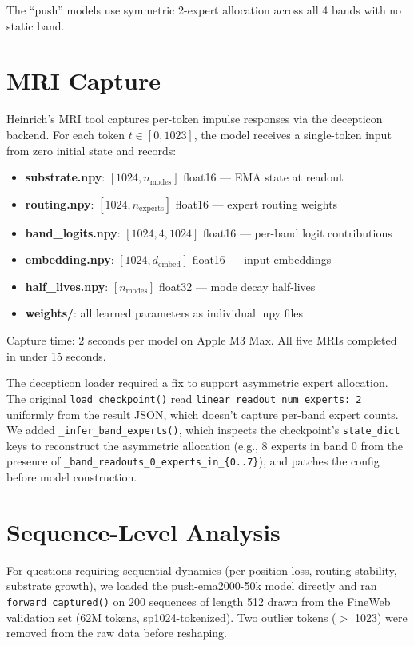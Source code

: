 \documentclass[11pt,a4paper]{report}
\begin{document}
The ``push'' models use symmetric 2-expert allocation across all 4 bands with no static band.

\section{MRI Capture}

Heinrich's MRI tool captures per-token impulse responses via the decepticon backend. For each token $t \in [0, 1023]$, the model receives a single-token input from zero initial state and records:

\begin{itemize}[nosep]
\item \textbf{substrate.npy}: $[1024, n_{\text{modes}}]$ float16 --- EMA state at readout
\item \textbf{routing.npy}: $[1024, n_{\text{experts}}]$ float16 --- expert routing weights
\item \textbf{band\_logits.npy}: $[1024, 4, 1024]$ float16 --- per-band logit contributions
\item \textbf{embedding.npy}: $[1024, d_{\text{embed}}]$ float16 --- input embeddings
\item \textbf{half\_lives.npy}: $[n_{\text{modes}}]$ float32 --- mode decay half-lives
\item \textbf{weights/}: all learned parameters as individual .npy files
\end{itemize}

Capture time: 2 seconds per model on Apple M3 Max. All five MRIs completed in under 15 seconds.

The decepticon loader required a fix to support asymmetric expert allocation. The original \texttt{load\_checkpoint()} read \texttt{linear\_readout\_num\_experts: 2} uniformly from the result JSON, which doesn't capture per-band expert counts. We added \texttt{\_infer\_band\_experts()}, which inspects the checkpoint's \texttt{state\_dict} keys to reconstruct the asymmetric allocation (e.g., 8 experts in band 0 from the presence of \texttt{\_band\_readouts\_0\_experts\_in\_\{0..7\}}), and patches the config before model construction.

\section{Sequence-Level Analysis}

For questions requiring sequential dynamics (per-position loss, routing stability, substrate growth), we loaded the push-ema2000-50k model directly and ran \texttt{forward\_captured()} on 200 sequences of length 512 drawn from the FineWeb validation set (62M tokens, sp1024-tokenized). Two outlier tokens ($>$ 1023) were removed from the raw data before reshaping.
\end{document}
